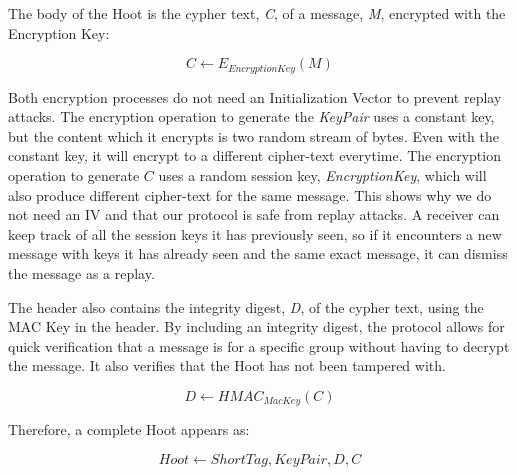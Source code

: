 The body of the Hoot is the cypher text, \textit{C}, of a message, \textit{M}, encrypted with the Encryption Key:

\begin{equation*}
	C \leftarrow E_{\mathit{EncryptionKey}}\left(M\right)
\end{equation*}

Both encryption processes do not need an Initialization Vector to prevent replay attacks. The encryption operation to generate the \textit{KeyPair} uses a constant key, but the content which it encrypts is two random stream of bytes. Even with the constant key, it will encrypt to a different cipher-text everytime. The encryption operation to generate $C$ uses a random session key, \textit{EncryptionKey}, which will also produce different cipher-text for the same message. This shows why we do not need an IV and that our protocol is safe from replay attacks. A receiver can keep track of all the session keys it has previously seen, so if it encounters a new message with keys it has already seen and the same exact message, it can dismiss the message as a replay.

The header also contains the integrity digest, \textit{D}, of the cypher text, using the MAC Key in the header. By including an integrity digest, the protocol allows for quick verification that a message is for a specific group without having to decrypt the message. It also verifies that the Hoot has not been tampered with. 

\begin{equation*}
	D \leftarrow \mathit{HMAC}_{\mathit{MacKey}}\left(C\right)
\end{equation*}

Therefore, a complete Hoot appears as:

\begin{equation*}
	\mathit{Hoot} \leftarrow \mathit{ShortTag},\mathit{KeyPair},D,C
\end{equation*}